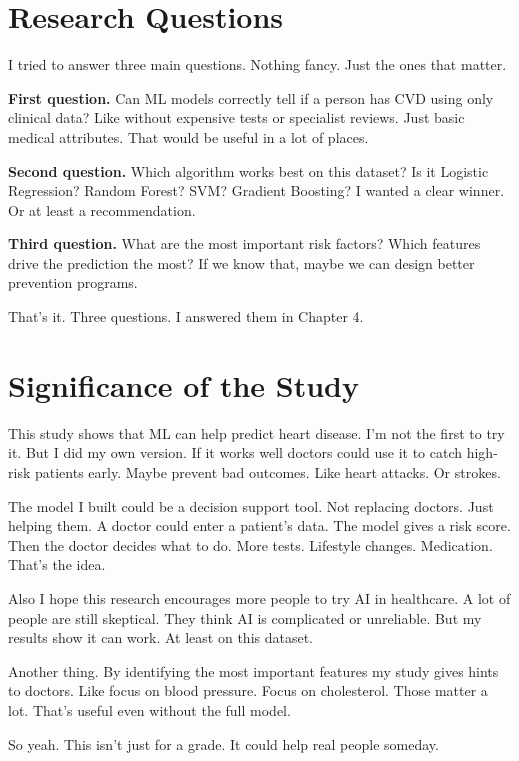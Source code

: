 \documentclass[12pt, a4paper, oneside]{book}
\begin{document}
\section{Research Questions}

I tried to answer three main questions. Nothing fancy. Just the ones that matter.

\textbf{First question.} Can ML models correctly tell if a person has CVD using only clinical data? Like without expensive tests or specialist reviews. Just basic medical attributes. That would be useful in a lot of places.

\textbf{Second question.} Which algorithm works best on this dataset? Is it Logistic Regression? Random Forest? SVM? Gradient Boosting? I wanted a clear winner. Or at least a recommendation.

\textbf{Third question.} What are the most important risk factors? Which features drive the prediction the most? If we know that, maybe we can design better prevention programs.

That's it. Three questions. I answered them in Chapter 4.

\section{Significance of the Study}

This study shows that ML can help predict heart disease. I'm not the first to try it. But I did my own version. If it works well doctors could use it to catch high-risk patients early. Maybe prevent bad outcomes. Like heart attacks. Or strokes.

The model I built could be a decision support tool. Not replacing doctors. Just helping them. A doctor could enter a patient's data. The model gives a risk score. Then the doctor decides what to do. More tests. Lifestyle changes. Medication. That's the idea.

Also I hope this research encourages more people to try AI in healthcare. A lot of people are still skeptical. They think AI is complicated or unreliable. But my results show it can work. At least on this dataset.

Another thing. By identifying the most important features my study gives hints to doctors. Like focus on blood pressure. Focus on cholesterol. Those matter a lot. That's useful even without the full model.

So yeah. This isn't just for a grade. It could help real people someday.
\end{document}
